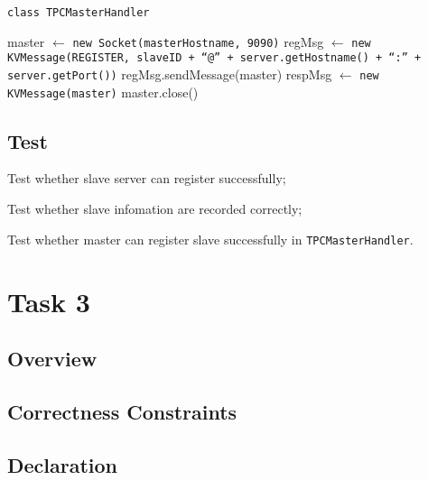 \documentclass{article}
\begin{document}
\begin{algorithm}
	\caption{\texttt{class TPCMasterHandler}}
	\begin{algorithmic}
			\State master $\leftarrow$ \texttt{new Socket(masterHostname, 9090)}
			\State regMsg $\leftarrow$ \texttt{new KVMessage(REGISTER, slaveID + ``@'' + server.getHostname()
			+ ``:'' + server.getPort())}
			\State regMsg.sendMessage(master)
			\State respMsg $\leftarrow$ \texttt{new KVMessage(master)}
			\State master.close()
		\EndProcedure
	\end{algorithmic}
\end{algorithm}
\subsection{Test}
\begin{compactitem}
	\item Test whether slave server can register successfully;
	\item Test whether slave infomation are recorded correctly;
	\item Test whether master can register slave successfully in \texttt{TPCMasterHandler}.
\end{compactitem}

\section{Task 3}
\subsection{Overview}
\subsection{Correctness Constraints}
\subsection{Declaration}
\end{document}
